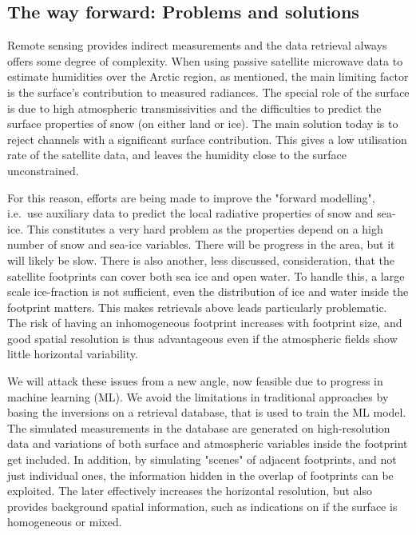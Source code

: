 \documentclass[12pt,oneside,a4paper]{article}
\begin{document}
\subsection{The way forward: Problems and solutions }

Remote sensing provides indirect measurements and the data retrieval always offers some degree of complexity. When using passive satellite microwave data to estimate humidities over the Arctic region, as mentioned, the main limiting factor is the surface's contribution to measured radiances. The special role of the surface is due to high atmospheric transmissivities and the difficulties to predict the surface properties of snow (on either land or ice).
The main solution today is to reject channels with a significant surface
contribution. This gives a low utilisation rate of the satellite data, and
leaves the humidity close to the surface unconstrained.

For this reason, efforts are being made to improve the "forward modelling",
i.e.\ use auxiliary data to predict the local radiative properties of snow and
sea-ice. This constitutes a very hard problem
as the properties depend on a high number of snow and sea-ice
variables. There will be progress in the area, but it will likely be slow.
There is also another, less discussed, consideration, that the satellite
footprints can cover both sea ice and open water. To handle this, a large scale
ice-fraction is not sufficient, even the distribution of ice and water inside
the footprint matters. This makes retrievals above leads particularly
problematic. The risk of having an inhomogeneous footprint increases with
footprint size, and good spatial resolution is thus advantageous even if the atmospheric fields show little horizontal variability.



We will attack these issues from a new angle, now feasible due to progress in
machine learning (ML). We avoid the limitations in traditional approaches by
basing the inversions on a retrieval database, that is used to train the ML
model. The simulated measurements in the database are generated on
high-resolution data and variations of both surface and atmospheric variables
inside the footprint get included. In addition, by simulating "scenes" of
adjacent footprints, and not just individual ones, the information hidden in the overlap of footprints can be exploited. The later effectively increases the horizontal resolution, but also provides background spatial information, such as indications on if the surface is homogeneous or mixed.
\end{document}

